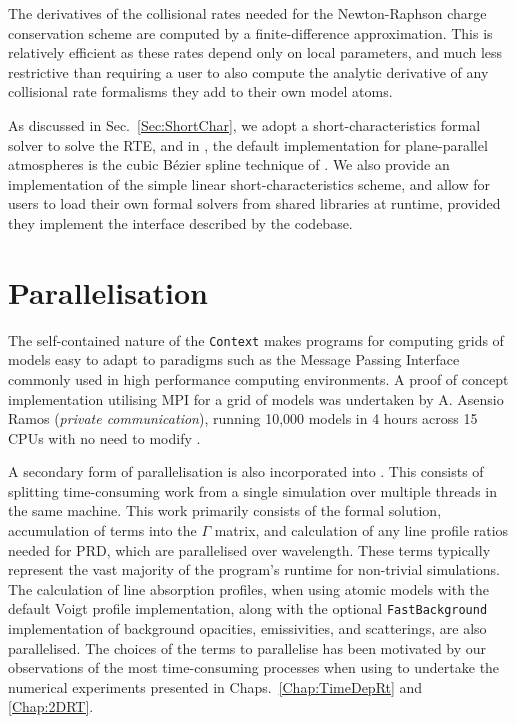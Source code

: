 The derivatives of the collisional rates needed for the Newton-Raphson charge conservation scheme are computed by a finite-difference approximation.
This is relatively efficient as these rates depend only on local parameters, and much less restrictive than requiring a user to also compute the analytic derivative of any collisional rate formalisms they add to their own model atoms.

As discussed in Sec.~\ref{Sec:ShortChar}, we adopt a short-characteristics formal solver to solve the RTE, and in \Lw{}, the default implementation for plane-parallel atmospheres is the cubic Bézier spline technique of \citet{DelaCruzRodriguez2013}.
We also provide an implementation of the simple linear short-characteristics scheme, and allow for users to load their own formal solvers from shared libraries at runtime, provided they implement the interface described by the \Lw{} codebase.

\section{Parallelisation}\label{Sec:LwParallelisation}

The self-contained nature of the \texttt{Context} makes \Lw{} programs for computing grids of models easy to adapt to paradigms such as the Message Passing Interface \citep[MPI, e.g.][for an overview of the MPICH implementation]{Gropp1996} commonly used in high performance computing environments.
A proof of concept implementation utilising MPI for a grid of models was undertaken by A. Asensio Ramos (\emph{private communication}), running 10,000 models in 4 hours across 15 CPUs with no need to modify \Lw{}.

A secondary form of parallelisation is also incorporated into \Lw{}.
This consists of splitting time-consuming work from a single simulation over multiple threads in the same machine.
This work primarily consists of the formal solution, accumulation of terms into the $\Gamma$ matrix, and calculation of any line profile ratios needed for PRD, which are parallelised over wavelength.
These terms typically represent the vast majority of the program's runtime for non-trivial simulations.
The calculation of line absorption profiles, when using atomic models with the default Voigt profile implementation, along with the optional \texttt{FastBackground} implementation of background opacities, emissivities, and scatterings, are also parallelised.
The choices of the terms to parallelise has been motivated by our observations of the most time-consuming processes when using \Lw{} to undertake the numerical experiments presented in Chaps.~\ref{Chap:TimeDepRt} and \ref{Chap:2DRT}.


